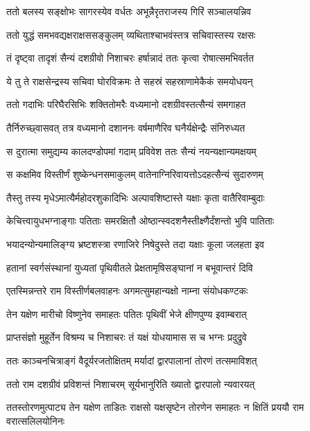 \twolineshloka
{ततो बलस्य सङ्क्षोभः सागरस्येव वर्धतः}
{अभून्नैरृतराजस्य गिरिं सञ्चालयन्निव} %

\twolineshloka
{ततो युद्धं समभवद्यक्षराक्षससङ्कुलम्}
{व्यथिताश्चाभवंस्तत्र सचिवास्तस्य रक्षसः} %

\twolineshloka
{तं दृष्ट्वा तादृशं सैन्यं दशग्रीवो निशाचरः}
{हर्षान्नादं ततः कृत्वा रोषात्समभिवर्तत} %

\twolineshloka
{ये तु ते राक्षसेन्द्रस्य सचिवा घोरविक्रमः}
{ते सहस्रं सहस्राणामेकैकं समयोधयन्} %

\twolineshloka
{ततो गदाभिः परिघैरसिभिः शक्तितोमरैः}
{वध्यमानो दशग्रीवस्तत्सैन्यं समगाहत} %

\twolineshloka
{तैर्निरुच्छ्वासवत् तत्र वध्यमानो दशाननः}
{वर्षमाणैरिव घनैर्यक्षेन्द्रैः संनिरुध्यत} %

\twolineshloka
{स दुरात्मा समुद्यम्य कालदण्डोपमां गदाम्}
{प्रविवेश ततः सैन्यं नयन्यक्षान्यमक्षयम्} %

\twolineshloka
{स कक्षमिव विस्तीर्णं शुष्केन्धनसमाकुलम्}
{वातेनाग्निरिवायत्तोऽदहत्सैन्यं सुदारुणम्} %

\twolineshloka
{तैस्तु तस्य मृधेऽमात्यैर्महोदरशुकादिभिः}
{अल्पावशिष्टास्ते यक्षाः कृता वातैरिवाम्बुदाः} %

\twolineshloka
{केचित्त्वायुधभग्नाङ्गाः पतिताः समरक्षितौ}
{ओष्ठान्स्वदशनैस्तीक्ष्णैर्दंशन्तो भुवि पातिताः} %

\twolineshloka
{भयादन्योन्यमालिङ्ग्य भ्रष्टशस्त्रा रणाजिरे}
{निषेदुस्ते तदा यक्षाः कूला जलहता इव} %

\twolineshloka
{हतानां स्वर्गसंस्थानां युध्यतां पृथिवीतले}
{प्रेक्षतामृषिसङ्घानां न बभूवान्तरं दिवि} %

\twolineshloka
{एतस्मिन्नन्तरे राम विस्तीर्णबलवाहनः}
{अगमत्सुमहान्यक्षो नाम्ना संयोधकण्टकः} %

\twolineshloka
{तेन यक्षेण मारीचो विष्णुनेव समाहतः}
{पतितः पृथिवीं भेजे क्षीणपुण्य इवाम्बरात्} %

\twolineshloka
{प्राप्तसंज्ञो मुहूर्तेन विश्रम्य च निशाचरः}
{तं यक्षं योधयामास स च भग्नः प्रदुद्रुवे} %

\twolineshloka
{ततः काञ्चनचित्राङ्गं वैदूर्यरजतोक्षितम्}
{मर्यादां द्वारपालानां तोरणं तत्समाविशत्} %

\twolineshloka
{ततो राम दशग्रीवं प्रविशन्तं निशाचरम्}
{सूर्यभानुरिति ख्यातो द्वारपालो न्यवारयत्} %

\threelineshloka
{ततस्तोरणमुत्पाट्य तेन यक्षेण ताडितः}
{राक्षसो यक्षसृष्टेन तोरणेन समाहतः}
{न क्षितिं प्रययौ राम वरात्सलिलयोनिनः} %

